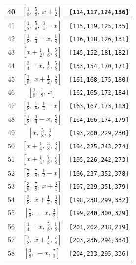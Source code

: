 \documentclass[fleqn,8pt]{jsarticle}
\begin{document}
\begin{longtable}{ccc}
40 & $\left[ \frac{1}{8},\, \frac{5}{8},\, x + \frac{1}{2} \right]$ & {\tt [114,117,124,136]} \\ \hline
41 & $\left[ \frac{1}{8},\, \frac{5}{8},\, \frac{3}{4} - x \right]$ & {\tt [115,119,125,135]} \\ \hline
42 & $\left[ \frac{1}{8},\, \frac{1}{4} - x,\, \frac{1}{8} \right]$ & {\tt [116,118,126,131]} \\ \hline
43 & $\left[ x + \frac{1}{2},\, \frac{1}{8},\, \frac{5}{8} \right]$ & {\tt [145,152,181,182]} \\ \hline
44 & $\left[ \frac{3}{4} - x,\, \frac{1}{8},\, \frac{5}{8} \right]$ & {\tt [153,154,170,171]} \\ \hline
45 & $\left[ \frac{1}{8},\, x + \frac{1}{2},\, \frac{5}{8} \right]$ & {\tt [161,168,175,180]} \\ \hline
46 & $\left[ \frac{1}{8},\, \frac{1}{8},\, x \right]$ & {\tt [162,165,172,184]} \\ \hline
47 & $\left[ \frac{1}{8},\, \frac{1}{8},\, \frac{1}{4} - x \right]$ & {\tt [163,167,173,183]} \\ \hline
48 & $\left[ \frac{1}{8},\, \frac{3}{4} - x,\, \frac{5}{8} \right]$ & {\tt [164,166,174,179]} \\ \hline
49 & $\left[ x,\, \frac{5}{8},\, \frac{1}{8} \right]$ & {\tt [193,200,229,230]} \\ \hline
50 & $\left[ x + \frac{1}{4},\, \frac{3}{8},\, \frac{3}{8} \right]$ & {\tt [194,225,243,274]} \\ \hline
51 & $\left[ x + \frac{1}{4},\, \frac{7}{8},\, \frac{7}{8} \right]$ & {\tt [195,226,242,273]} \\ \hline
52 & $\left[ \frac{7}{8},\, \frac{7}{8},\, \frac{1}{2} - x \right]$ & {\tt [196,237,352,378]} \\ \hline
53 & $\left[ \frac{3}{8},\, \frac{7}{8},\, x + \frac{3}{4} \right]$ & {\tt [197,239,351,379]} \\ \hline
54 & $\left[ \frac{3}{8},\, x + \frac{1}{4},\, \frac{3}{8} \right]$ & {\tt [198,238,299,332]} \\ \hline
55 & $\left[ \frac{7}{8},\, - x,\, \frac{3}{8} \right]$ & {\tt [199,240,300,329]} \\ \hline
56 & $\left[ \frac{1}{4} - x,\, \frac{5}{8},\, \frac{1}{8} \right]$ & {\tt [201,202,218,219]} \\ \hline
57 & $\left[ \frac{7}{8},\, x + \frac{1}{4},\, \frac{7}{8} \right]$ & {\tt [203,236,294,334]} \\ \hline
58 & $\left[ \frac{3}{8},\, - x,\, \frac{7}{8} \right]$ & {\tt [204,233,295,336]} \\ \hline

\end{longtable}
\end{document}
